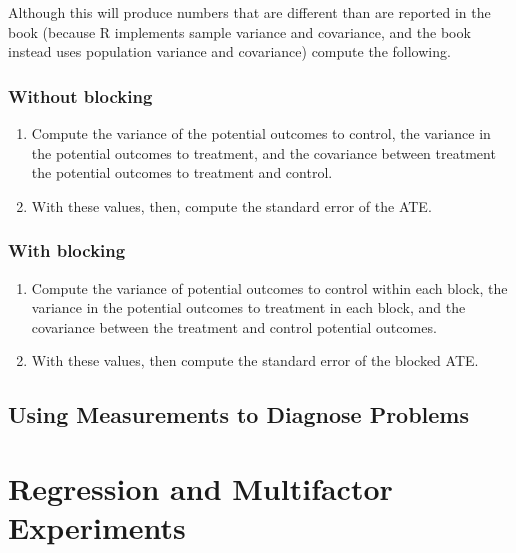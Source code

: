 \documentclass[
]{article}
\providecommand{\tightlist}{%
  \setlength{\itemsep}{0pt}\setlength{\parskip}{0pt}}
\begin{document}
Although this will produce numbers that are different than are reported in the book (because R implements sample variance and covariance, and the book instead uses population variance and covariance) compute the following.

\hypertarget{without-blocking}{%
\subsubsection{Without blocking}\label{without-blocking}}

\begin{enumerate}
\def\labelenumi{\arabic{enumi}.}
\tightlist
\item
  Compute the variance of the potential outcomes to control, the variance in the potential outcomes to treatment, and the covariance between treatment the potential outcomes to treatment and control.
\item
  With these values, then, compute the standard error of the ATE.
\end{enumerate}

\hypertarget{with-blocking}{%
\subsubsection{With blocking}\label{with-blocking}}

\begin{enumerate}
\def\labelenumi{\arabic{enumi}.}
\tightlist
\item
  Compute the variance of potential outcomes to control within each block, the variance in the potential outcomes to treatment in each block, and the covariance between the treatment and control potential outcomes.
\item
  With these values, then compute the standard error of the blocked ATE.
\end{enumerate}

\hypertarget{using-measurements-to-diagnose-problems}{%
\subsection{Using Measurements to Diagnose Problems}\label{using-measurements-to-diagnose-problems}}

\hypertarget{regression-and-multifactor-experiments}{%
\section{Regression and Multifactor Experiments}\label{regression-and-multifactor-experiments}}
\end{document}
